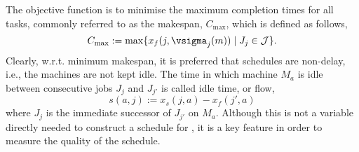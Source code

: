 The objective function is to minimise the maximum completion times for all tasks, commonly referred to as the makespan, $C_{\max}$, which is defined as follows,
\begin{equation}
  C_{\max} := \max\{x_f(j,\vsigma_j(m))\;|\;J_j\in\mathcal{J}\}.\label{eq:makespan}
\end{equation} 
Clearly, w.r.t. minimum makespan, it is preferred that schedules are non-delay, i.e., the machines are not kept idle. The time in which machine $M_a$ is idle between consecutive jobs $J_j$ and $J_{j'}$ is called idle time, or flow, 
\begin{equation} s(a,j):=x_s(j,a)-x_f(j',a) \label{eq:slack}\end{equation}
where $J_j$ is the immediate successor of $J_{j'}$ on $M_a$. Although this is not a variable directly needed to construct a schedule for \JSP, it is a key feature in order to measure the quality of the schedule. 

